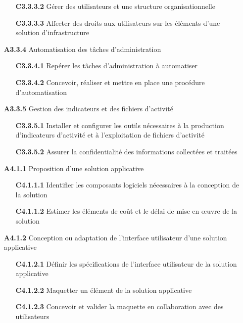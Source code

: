 \documentclass[12pt,a4paper,oneside,titlepage,final]{article}
\begin{document}
\begin{enumerate}
\begin{itemize}
    \item [\textbf{C3.3.3.2}] Gérer des utilisateurs et une structure
    organisationnelle
    \item [\textbf{C3.3.3.3}] Affecter des droits aux utilisateurs sur
    les éléments d'une solution d'infrastructure
  \end{itemize}
  \item [\textbf{A3.3.4}] Automatisation des tâches d'administration
  \begin{itemize}
    \item [\textbf{C3.3.4.1}] Repérer les tâches
    d'administration à automatiser
    \item [\textbf{C3.3.4.2}] Concevoir, réaliser et mettre en place
    une procédure d'automatisation
  \end{itemize}
  \item [\textbf{A3.3.5}] Gestion des indicateurs et des fichiers
  d'activité
  \begin{itemize}
    \item [\textbf{C3.3.5.1}] Installer et configurer les outils
    nécessaires à la production d'indicateurs d'activité et à
    l'exploitation de fichiers d'activité
    \item [\textbf{C3.3.5.2}] Assurer la confidentialité des
    informations collectées et traitées
  \end{itemize}
  \item [\textbf{A4.1.1}] Proposition d'une solution applicative
  \begin{itemize}
    \item [\textbf{C4.1.1.1}] Identifier les composants
    logiciels nécessaires à la conception de la solution
    \item [\textbf{C4.1.1.2}] Estimer les éléments de coût et le délai
    de mise en œuvre de la solution
  \end{itemize}
  \item [\textbf{A4.1.2}] Conception ou adaptation de l'interface
  utilisateur d'une solution applicative
  \begin{itemize}
    \item [\textbf{C4.1.2.1}] Définir les spécifications de
    l'interface utilisateur de la solution applicative
    \item [\textbf{C4.1.2.2}] Maquetter un élément de la solution
    applicative
    \item [\textbf{C4.1.2.3}] Concevoir et valider la maquette en
    collaboration avec des utilisateurs
  \end{itemize}

\end{enumerate}
\end{document}
